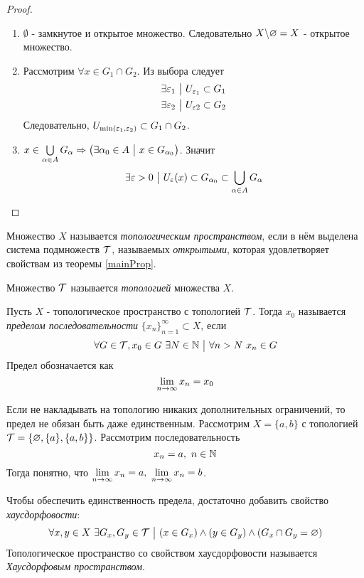 \begin{proof}~
	\begin{enumerate}
		\item $\emptyset$ - замкнутое и открытое множество. Следовательно $X \backslash \varnothing = X$ - открытое множество.
		
		\item Рассмотрим $\forall x \in G_1 \cap G_2$. Из выбора следует
		\begin{align*}
			&\exists \varepsilon_1 \ \big|\  U_{\varepsilon_1} \subset G_1
			\\
			&\exists \varepsilon_2 \ \big|\  U_{\varepsilon 2} \subset G_2 
		\end{align*}
		Следовательно, $U_{\min(\varepsilon_1, \varepsilon_2)} \subset G_1 \cap G_2$.
		
		\item $x \in \bigcup\limits_{\alpha \in A} G_\alpha \Rightarrow \left(\exists \alpha_0 \in A \ \big|\  x \in G_{\alpha_0}\right)$. Значит
		\[
			\exists \varepsilon > 0 \ \big|\  U_\varepsilon(x) \subset G_{\alpha_0} \subset \bigcup\limits_{\alpha \in A} G_{\alpha}
		\]
	\end{enumerate}
\end{proof}

\begin{definition}
	Множество $X$ называется \textit{топологическим пространством}, если в нём выделена система подмножеств $\mathcal{T}$, называемых \textit{открытыми}, которая удовлетворяет свойствам из теоремы \ref{mainProp}.
	
	Множество $\mathcal{T}$ называется \textit{топологией} множества $X$.
\end{definition}

\begin{definition}
	Пусть $X$ - топологическое пространство с топологией $\mathcal{T}$. Тогда $x_0$ называется \textit{пределом последовательности} $\{x_n\}_{n = 1}^\infty \subset X$, если
	\[
		\forall G \in \mathcal{T}, x_0 \in G\ \exists N \in \mathbb{N} \ \big|\  \forall n > N\ x_n \in G
	\]
	Предел обозначается как
	\[
		\lim\limits_{n \to \infty} x_n = x_0
	\]
\end{definition}

\begin{example}
	Если не накладывать на топологию никаких дополнительных ограничений, то предел не обязан быть даже единственным. Рассмотрим $X = \{a, b\}$ с топологией $\mathcal{T} = \{\varnothing, \{a\}, \{a, b\}\}$. Рассмотрим последовательность
	\[
		x_n = a,\ n \in \mathbb{N}
	\]
	Тогда понятно, что $\lim\limits_{n \to \infty} x_n = a,\ \lim\limits_{n \to \infty} x_n = b$.
\end{example}

\begin{anote}
	Чтобы обеспечить единственность предела, достаточно добавить свойство \textit{хаусдорфовости}:
	\[
		\forall x, y \in X\ \exists G_x, G_y \in \mathcal{T} \ \big|\  (x \in G_x) \wedge (y \in G_y) \wedge (G_x \cap G_y = \varnothing)
	\]
	Топологическое пространство со свойством хаусдорфовости называется \textit{Хаусдорфовым пространством}.
\end{anote}